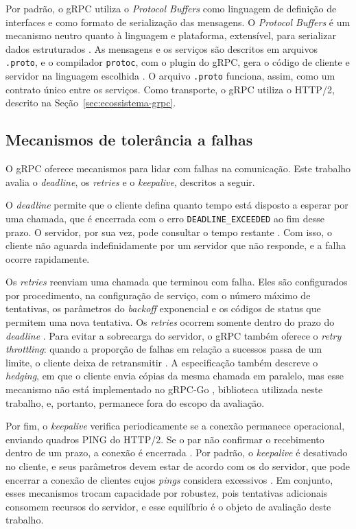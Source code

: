 Por padrão, o gRPC utiliza o \textit{Protocol Buffers} \cite{Protobuf:2026} como linguagem de
definição de interfaces e como formato de serialização das mensagens. O \textit{Protocol Buffers} é
um mecanismo neutro quanto à linguagem e plataforma, extensível, para serializar dados estruturados
\cite{Protobuf:2026}. As mensagens e os serviços são descritos em arquivos \texttt{.proto}, e o
compilador \texttt{protoc}, com o plugin do gRPC, gera o código de cliente e servidor na linguagem
escolhida \cite{gRPC-Documentation:2026}. O arquivo \texttt{.proto} funciona, assim, como um
contrato único entre os serviços. Como transporte, o gRPC utiliza o HTTP/2, descrito na
Seção~\ref{sec:ecossistema-grpc}.

\subsection{Mecanismos de tolerância a falhas}\label{sec:mecanismos-grpc}

O gRPC oferece mecanismos para lidar com falhas na comunicação. Este trabalho avalia o
\textit{deadline}, os \textit{retries} e o \textit{keepalive}, descritos a seguir.

O \textit{deadline} permite que o cliente defina quanto tempo está disposto a esperar por uma
chamada, que é encerrada com o erro \texttt{DEADLINE\_EXCEEDED} ao fim desse prazo. O servidor, por
sua vez, pode consultar o tempo restante \cite{gRPC-Documentation:2026}. Com isso, o cliente não
aguarda indefinidamente por um servidor que não responde, e a falha ocorre rapidamente.

Os \textit{retries} reenviam uma chamada que terminou com falha. Eles são configurados por procedimento,
na configuração de serviço, com o número máximo de tentativas, os parâmetros do \textit{backoff}
exponencial e os códigos de status que permitem uma nova tentativa. Os \textit{retries} ocorrem somente
dentro do prazo do \textit{deadline} \cite{gRPC-Retry:2026}. Para evitar a sobrecarga do servidor,
o gRPC também oferece o \textit{retry throttling}: quando a proporção de falhas em relação a
sucessos passa de um limite, o cliente deixa de retransmitir \cite{gRFC-A6:2024}. A especificação
também descreve o \textit{hedging}, em que o cliente envia cópias da mesma chamada em paralelo, mas
esse mecanismo não está implementado no gRPC-Go \cite{gRFC-A6:2024}, biblioteca utilizada neste
trabalho, e, portanto, permanece fora do escopo da avaliação.

Por fim, o \textit{keepalive} verifica periodicamente se a conexão permanece operacional, enviando
quadros PING do HTTP/2. Se o par não confirmar o recebimento dentro de um prazo, a conexão é
encerrada \cite{gRPC-Keepalive:2026}. Por padrão, o \textit{keepalive} é desativado no cliente, e
seus parâmetros devem estar de acordo com os do servidor, que pode encerrar a conexão de clientes
cujos \textit{pings} considera excessivos \cite{gRPC-Keepalive:2026}. Em conjunto, esses mecanismos
trocam capacidade por robustez, pois tentativas adicionais consomem recursos do servidor, e esse
equilíbrio é o objeto de avaliação deste trabalho.

